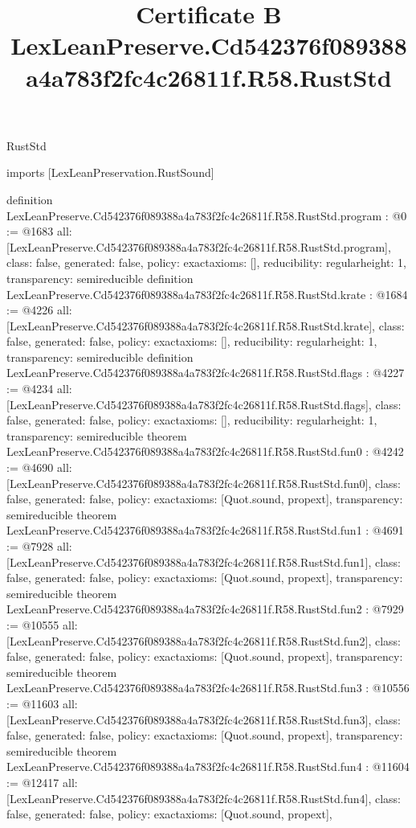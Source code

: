 \begin{lexlean}{RustStd}
\title{Certificate B LexLeanPreserve.Cd542376f089388a4a783f2fc4c26811f.R58.RustStd}
\begin{coremodule}
imports [LexLeanPreservation.RustSound]

definition LexLeanPreserve.Cd542376f089388a4a783f2fc4c26811f.R58.RustStd.program : @0 := @1683 {
  all: [LexLeanPreserve.Cd542376f089388a4a783f2fc4c26811f.R58.RustStd.program],
  class: false,
  generated: false,
  policy: exact{axioms: []},
  reducibility: regular{height: 1},
  transparency: semireducible
}
definition LexLeanPreserve.Cd542376f089388a4a783f2fc4c26811f.R58.RustStd.krate : @1684 := @4226 {
  all: [LexLeanPreserve.Cd542376f089388a4a783f2fc4c26811f.R58.RustStd.krate],
  class: false,
  generated: false,
  policy: exact{axioms: []},
  reducibility: regular{height: 1},
  transparency: semireducible
}
definition LexLeanPreserve.Cd542376f089388a4a783f2fc4c26811f.R58.RustStd.flags : @4227 := @4234 {
  all: [LexLeanPreserve.Cd542376f089388a4a783f2fc4c26811f.R58.RustStd.flags],
  class: false,
  generated: false,
  policy: exact{axioms: []},
  reducibility: regular{height: 1},
  transparency: semireducible
}
theorem LexLeanPreserve.Cd542376f089388a4a783f2fc4c26811f.R58.RustStd.fun0 : @4242 := @4690 {
  all: [LexLeanPreserve.Cd542376f089388a4a783f2fc4c26811f.R58.RustStd.fun0],
  class: false,
  generated: false,
  policy: exact{axioms: [Quot.sound, propext]},
  transparency: semireducible
}
theorem LexLeanPreserve.Cd542376f089388a4a783f2fc4c26811f.R58.RustStd.fun1 : @4691 := @7928 {
  all: [LexLeanPreserve.Cd542376f089388a4a783f2fc4c26811f.R58.RustStd.fun1],
  class: false,
  generated: false,
  policy: exact{axioms: [Quot.sound, propext]},
  transparency: semireducible
}
theorem LexLeanPreserve.Cd542376f089388a4a783f2fc4c26811f.R58.RustStd.fun2 : @7929 := @10555 {
  all: [LexLeanPreserve.Cd542376f089388a4a783f2fc4c26811f.R58.RustStd.fun2],
  class: false,
  generated: false,
  policy: exact{axioms: [Quot.sound, propext]},
  transparency: semireducible
}
theorem LexLeanPreserve.Cd542376f089388a4a783f2fc4c26811f.R58.RustStd.fun3 : @10556 := @11603 {
  all: [LexLeanPreserve.Cd542376f089388a4a783f2fc4c26811f.R58.RustStd.fun3],
  class: false,
  generated: false,
  policy: exact{axioms: [Quot.sound, propext]},
  transparency: semireducible
}
theorem LexLeanPreserve.Cd542376f089388a4a783f2fc4c26811f.R58.RustStd.fun4 : @11604 := @12417 {
  all: [LexLeanPreserve.Cd542376f089388a4a783f2fc4c26811f.R58.RustStd.fun4],
  class: false,
  generated: false,
  policy: exact{axioms: [Quot.sound, propext]},
}
\end{coremodule}
\end{lexlean}
